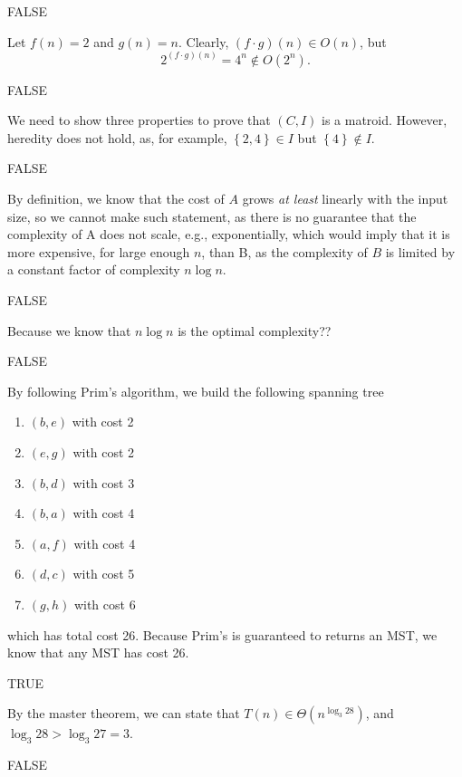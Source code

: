 FALSE


Let $f(n)=2$ and $g(n) = n$.
Clearly, $\left( f\cdot g \right)(n)  \in O(n)$, but \[
2^{(f\cdot g)(n)} = 4^{n} \not\in O(2^{n})
.\] 

FALSE


We need to show three properties to prove that $(C,I)$ is a matroid.
However, heredity does not hold, as, for example, $\left\{ 2,4 \right\} \in I$ but $\left\{ 4 \right\} \not\in I$.

FALSE


By definition, we know that the cost of $A$ grows \emph{at least} linearly with the input size, so we cannot make such statement, as there is no guarantee that the complexity of A does not scale, e.g., exponentially, which would imply that it is more expensive, for large enough $n$, than B, as the complexity of $B$ is limited by a constant factor of complexity $n \log n$.

FALSE


Because we know that $n \log n$ is the optimal complexity??

FALSE


By following Prim's algorithm, we build the following spanning tree
\begin{enumerate}
    \item $(b,e)$ with cost 2
    \item $(e,g)$ with cost 2
    \item $(b,d)$ with cost 3
    \item $(b,a)$ with cost 4
    \item $(a,f)$ with cost 4
    \item $(d,c)$ with cost 5
    \item $(g,h)$ with cost 6
\end{enumerate}
which has total cost 26. 
Because Prim's is guaranteed to returns an MST, we know that any MST has cost 26.

TRUE


By the master theorem, we can state that $T(n) \in \Theta(n^{\log_3 28})$, and $\log_3 28 > \log_3 27 = 3$.

FALSE


